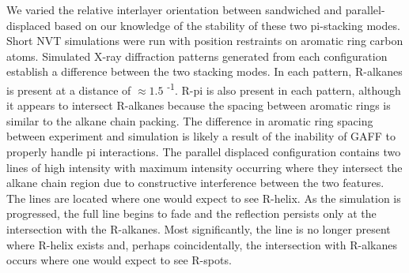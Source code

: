 We varied the relative interlayer orientation between sandwiched and 
parallel-displaced based on our knowledge of the stability of these two
pi-stacking modes. Short NVT simulations were run with position restraints
on aromatic ring carbon atoms. Simulated X-ray diffraction patterns 
generated from each configuration establish a difference between the two
stacking modes. In each pattern, R-alkanes is present at a distance of
$\approx 1.5$ \angstrom \textsuperscript{-1}. R-pi is also present in each 
pattern, although it appears to intersect R-alkanes because the spacing
between aromatic rings is similar to the alkane chain packing. The difference 
in aromatic ring spacing between experiment and simulation is likely a result
of the inability of GAFF to properly handle pi interactions. The parallel
displaced configuration contains two lines of high intensity with maximum
intensity occurring where they intersect the alkane chain region due to
constructive interference between the two features. The lines are located
where one would expect to see R-helix. As the simulation is progressed, 
the full line begins to fade and the reflection persists only at the 
intersection with the R-alkanes. Most significantly, the line is no
longer present where R-helix exists and, perhaps coincidentally, the 
intersection with R-alkanes occurs where one would expect to see R-spots.

